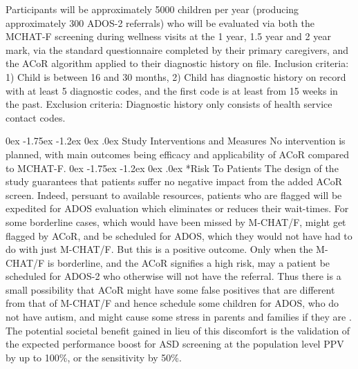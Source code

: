 \documentclass[onecolumn, compsoc,11pt]{IEEEtran}
\makeatletter
\renewcommand\subsection{\@startsection {subsection}{2}{\z@}%
                                   {0ex \@plus -1.75ex \@minus -1.2ex}%
                                   {0ex \@plus.0ex}%
                                   {\fontsize{11}{11}\selectfont\bfseries\sffamily\color{black}}}
\def\ZERO{ACoR\xspace}
\makeatother
\begin{document}

Participants will be approximately 5000 children per year (producing approximately 300 ADOS-2 referrals) who will be evaluated via both the MCHAT-F screening  during wellness visits at the 1 year, 1.5 year and 2 year mark, via the standard questionnaire completed by their primary caregivers, and the \ZERO algorithm applied to their diagnostic history on file. Inclusion criteria: 1) Child is between 16 and 30 months, 2) Child has diagnostic history on record with at least 5 diagnostic codes, and the first code is at least from 15 weeks in the past.  Exclusion criteria: Diagnostic history only consists of health service contact codes.

\subsection{Study Interventions and Measures}
No intervention is planned, with main outcomes being efficacy and applicability of \ZERO compared to MCHAT-F.
\subsection*{Risk To Patients} The design of the study guarantees that patients suffer no negative impact from the added \ZERO screen. Indeed, persuant to available resources, patients who are flagged will  be expedited for ADOS evaluation which eliminates or reduces their wait-times. For some borderline cases, which would have been missed by M-CHAT/F, might get flagged by \ZERO, and be scheduled for ADOS, which they would not have had to do with just M-CHAT/F. But this is a positive outcome. Only when the M-CHAT/F is borderline, and the \ZERO signifies a high risk, may a patient be scheduled for ADOS-2 who otherwise will not have the referral. Thus there is a small possibility  that \ZERO might have some false positives that are different from that of M-CHAT/F and hence schedule some children for ADOS, who do not have autism, and might cause some stress in parents and families if they are . The potential societal benefit gained in lieu of this discomfort is the validation of the expected  performance boost for ASD screening at the population level PPV by up to 100\%, or the sensitivity by 50\%.
\end{document}
